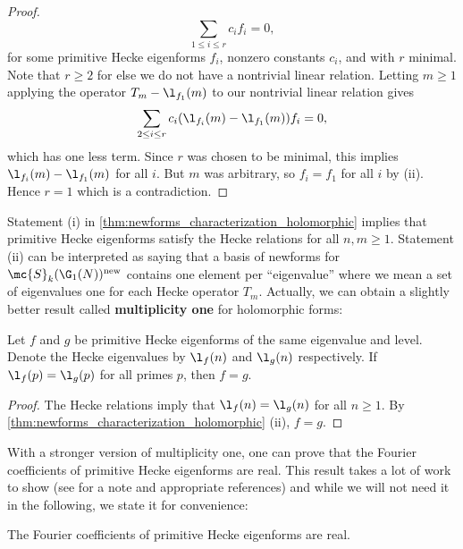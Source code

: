 \begin{proof}
      \[
        \sum_{1 \le i \le r}c_{i}f_{i} = 0,
      \]
      for some primitive Hecke eigenforms $f_{i}$, nonzero constants $c_{i}$, and with $r$ minimal. Note that $r \ge 2$ for else we do not have a nontrivial linear relation. Letting $m \ge 1$ applying the operator $T_{m}-\l_{f_{1}}(m)$ to our nontrivial linear relation gives
      \[
        \sum_{2 \le i \le r}c_{i}(\l_{f_{i}}(m)-\l_{f_{1}}(m))f_{i} = 0,
      \]
      which has one less term. Since $r$ was chosen to be minimal, this implies $\l_{f_{i}}(m)-\l_{f_{1}}(m)$ for all $i$. But $m$ was arbitrary, so $f_{i} = f_{1}$ for all $i$ by (ii). Hence $r = 1$ which is a contradiction.
    \end{proof}

    Statement (i) in \cref{thm:newforms_characterization_holomorphic} implies that primitive Hecke eigenforms satisfy the Hecke relations for all $n,m \ge 1$. Statement (ii) can be interpreted as saying that a basis of newforms for $\mc{S}_{k}(\G_{1}(N))^{\mathrm{new}}$ contains one element per ``eigenvalue'' where we mean a set of eigenvalues one for each Hecke operator $T_{m}$. Actually, we can obtain a slightly better result called \textbf{multiplicity one} for holomorphic forms:

    \begin{theorem}
      Let $f$ and $g$ be primitive Hecke eigenforms of the same eigenvalue and level. Denote the Hecke eigenvalues by $\l_{f}(n)$ and $\l_{g}(n)$ respectively. If $\l_{f}(p) = \l_{g}(p)$ for all primes $p$, then $f = g$.
    \end{theorem}
    \begin{proof}
      The Hecke relations imply that $\l_{f}(n) = \l_{g}(n)$ for all $n \ge 1$. By \cref{thm:newforms_characterization_holomorphic} (ii), $f = g$.
    \end{proof}
    
    With a stronger version of multiplicity one, one can prove that the Fourier coefficients of primitive Hecke eigenforms are real. This result takes a lot of work to show (see \cite{diamond2005first} for a note and appropriate references) and while we will not need it in the following, we state it for convenience:

    \begin{theorem}
      The Fourier coefficients of primitive Hecke eigenforms are real.
    \end{theorem}

